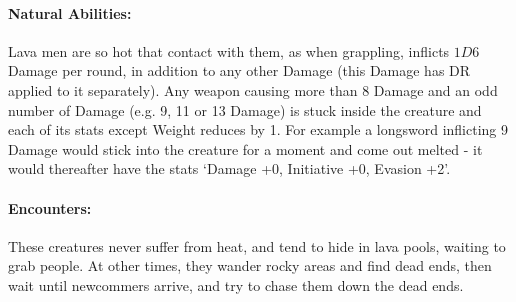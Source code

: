 \paragraph{Natural Abilities:} Lava men are so hot that contact with them, as when grappling, inflicts $1D6$ Damage per round, in addition to any other Damage (this Damage has DR applied to it separately).  Any weapon causing more than 8 Damage and an odd number of Damage (e.g. 9, 11 or 13 Damage) is stuck inside the creature and each of its stats except Weight reduces by 1.  For example a longsword inflicting 9 Damage would stick into the creature for a moment and come out melted - it would thereafter have the stats `Damage +0, Initiative +0, Evasion +2'.

\paragraph{Encounters:} These creatures never suffer from heat, and tend to hide in lava pools, waiting to grab people.  At other times, they wander rocky areas and find dead ends, then wait until newcommers arrive, and try to chase them down the dead ends.

